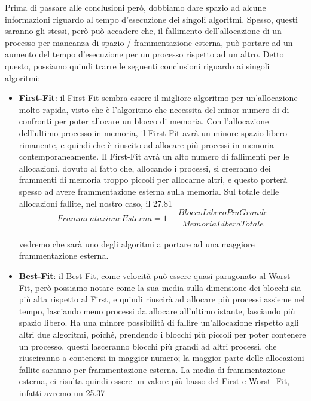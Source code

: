 \documentclass[20pt,a4paper,oneside]{article}
\begin{document}
Prima di passare alle conclusioni però, dobbiamo dare spazio ad alcune informazioni riguardo al tempo d'esecuzione dei singoli algoritmi. Spesso, questi saranno gli stessi, però può accadere che, il fallimento dell'allocazione di un processo per mancanza di spazio / frammentazione esterna, può portare ad un aumento del tempo d'esecuzione per un processo rispetto ad un altro. Detto questo, possiamo quindi trarre le seguenti conclusioni riguardo ai singoli algoritmi:
\begin{itemize}
\item \textbf{First-Fit}: il First-Fit sembra essere il migliore algoritmo per un'allocazione molto rapida, visto che è l'algoritmo che necessita del minor numero di di confronti per poter allocare un blocco di memoria. Con l'allocazione dell'ultimo processo in memoria, il First-Fit avrà un minore spazio libero rimanente, e quindi che è riuscito ad allocare più processi in memoria contemporaneamente. Il First-Fit avrà un alto numero di fallimenti per le allocazioni, dovuto al fatto che, allocando i processi, si creeranno dei frammenti di memoria troppo piccoli per allocarne altri, e questo porterà spesso ad avere frammentazione esterna sulla memoria. Sul totale delle allocazioni fallite, nel nostro caso, il 27.81%
\begin{equation*}
Frammentazione Esterna = 1 - \frac{Blocco Libero Piu Grande}{Memoria Libera Totale}
\end{equation*}
\\
vedremo che sarà uno degli algoritmi a portare ad una maggiore frammentazione esterna.

\item \textbf{Best-Fit}: il Best-Fit, come velocità può essere quasi paragonato al Worst-Fit, però possiamo notare come la sua media sulla dimensione dei blocchi sia più alta rispetto al First, e quindi riuscirà ad allocare più processi assieme nel tempo, lasciando meno processi da allocare all'ultimo istante, lasciando più spazio libero. Ha una minore possibilità di fallire un'allocazione rispetto agli altri due algoritmi, poiché, prendendo i blocchi più piccoli per poter contenere un processo, questi lasceranno blocchi più grandi ad altri processi, che riusciranno a contenersi in maggior numero; la maggior parte delle allocazioni fallite saranno per frammentazione esterna. La media di frammentazione esterna, ci risulta quindi essere un valore più basso del First e Worst -Fit, infatti avremo un 25.37%


\end{itemize}
\end{document}
